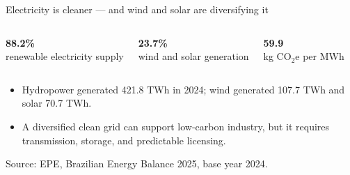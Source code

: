 \documentclass[10pt,aspectratio=169]{beamer}
\newcommand{\source}[1]{%
  \par\vfill{\tiny\color{MidGray}Source: #1}}
\newcommand{\muted}[1]{\textcolor{MidGray}{#1}}
\begin{document}
\begin{frame}{Electricity is cleaner --- and wind and solar are diversifying it}
  \begin{columns}[T,onlytextwidth]
      \begin{center}
        {\fontsize{32}{36}\selectfont\color{BrazilGreen}\textbf{88.2\%}}\\[-.05cm]
        \muted{renewable electricity supply}
      \end{center}
      \begin{center}
        {\fontsize{32}{36}\selectfont\color{DeepNavy}\textbf{23.7\%}}\\[-.05cm]
        \muted{wind and solar generation}
      \end{center}
      \begin{center}
        {\fontsize{30}{34}\selectfont\color{WarmGold}\textbf{59.9}}\\[-.05cm]
        \muted{kg CO$_2$e per MWh}
      \end{center}
  \end{columns}
  \vspace{.5cm}
  \begin{itemize}
    \item Hydropower generated 421.8 TWh in 2024; wind generated 107.7 TWh and solar 70.7 TWh.
    \item A diversified clean grid can support low-carbon industry, but it requires transmission, storage, and predictable licensing.
  \end{itemize}
  \source{EPE, Brazilian Energy Balance 2025, base year 2024.}
\end{frame}
\end{document}
